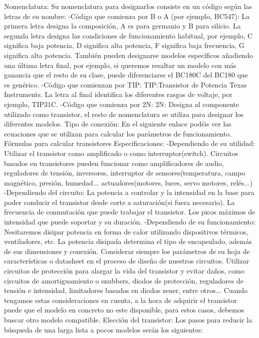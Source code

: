 \documentclass[11pt,a4paper]{article}
\begin{document}
Nomenclatura:
Su nomenclatura para designarlos consiste en un código según las letras de su nombre:
-Código que comienza por B o A (por ejemplo, BC547):
La primera letra designa la composición, A es para germanio y B para silicio.
La segunda letra designa las condiciones de funcionamiento habitual, por ejemplo, C significa baja potencia, D significa alta potencia, F significa baja frecuencia, G significa alta potencia.
También pueden designarse modelos específicos añadiendo una última letra final, por ejemplo, si queremos resaltar un modelo con más ganancia que el resto de su clase, puede diferenciarse el BC180C del BC180 que es genérico.
-Código que comienzan por TIP:
TIP:Transistor de Potencia Texas Instruments. La letra al final identifica los diferentes rasgos de voltaje, por ejemplo, TIP31C.
-Código que comienza por 2N:
2N: Designa al componente utilizado como transistor, el resto de nomenclatura se utiliza para designar los diferentes modelos.
Tipo de conexión:
En el siguiente enlace podéis ver las ecuaciones que se utilizan para calcular los parámetros de funcionamiento.
 Fórmulas para calcular transistores
Especificaciones:
-Dependiendo de su utilidad:
Utilizar el transistor como amplificado o como interruptor(switch).
Circuitos basados en transistores pueden funcionar como amplificadores de audio, reguladores de tensión, inversores, interruptor de sensores(temperatura, campo magnético, presión, humedad...  actuadores(motores, luces, servo motores, relés...)
-Dependiendo del circuito:
La potencia a controlar y la intensidad en la base para poder conducir el transistor desde corte a saturación(si fuera necesario).
La frecuencia de conmutación que puede trabajar el transistor.
Los picos máximos de intensidad que puede soportar y su duración.
-Dependiendo de su funcionamiento:
Nesitaremos disipar potencia en forma de calor utilizando dispositivos térmicos, ventiladores, etc.
La potencia disipada determina el tipo de encapsulado, además de sus dimensiones y conexión.
Considerar siempre los parámetros de su hoja de características o datasheet en el proceso de diseño de nuestros circuitos.
Utilizar circuitos de protección para alargar la vida del transistor y evitar daños, como circuitos de amortiguamiento o snubbers, diodos de protección, reguladores de tensión e intensidad, limitadores basados en diodos zener, entre otros...
Cuando tengamos estas consideraciones en cuenta, a la hora de adquirir el transistor puede que el modelo en concreto no este disponible, para estos casos, debemos buscar otro modelo compatible.
Elección del transistor:
Los pasos para reducir la búsqueda de una larga lista a pocos modelos serán los siguientes:
\end{document}
